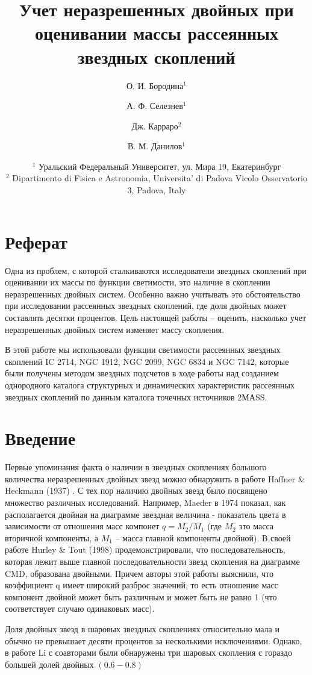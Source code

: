 \documentclass[a4paper,12pt]{article}
\title{Учет неразрешенных двойных при оценивании массы рассеянных звездных скоплений}
\author{О. И. Бородина$^1$ \and А. Ф. Селезнев$^1$ \and Дж. Карраро$^2$ \and В. М. Данилов$^1$ }
\date{\footnotesize{
    $^1$ Уральский Федеральный Университет, ул. Мира 19, Екатеринбург\\%
    $^2$ Dipartimento di Fisica e Astronomia, Universita’ di Padova Vicolo Osservatorio 3, Padova, Italy}\\%
    }
\begin{document}
\maketitle
\section*{Реферат}
Одна из проблем, с которой сталкиваются исследователи звездных скоплений при оценивании их массы по функции светимости, это наличие в скоплении неразрешенных двойных систем. Особенно важно учитывать это обстоятельство при исследовании рассеянных звездных скоплений, где доля двойных может составлять десятки процентов. Цель настоящей работы -- оценить, насколько учет неразрешенных двойных систем изменяет массу скопления.
 
В этой работе мы использовали функции светимости рассеянных звездных скоплений IC 2714, NGC 1912, NGC 2099, NGC 6834 и NGC 7142, которые были получены методом звездных подсчетов в ходе работы над созданием однородного каталога структурных и динамических характеристик рассеянных звездных скоплений по данным каталога точечных источников 2МАSS.

\section*{Введение}
Первые упоминания факта о наличии в звездных скоплениях большого количества неразрешенных двойных звезд можно обнаружить в работе Haffner \& Heckmann (1937) \cite{HH}.
С тех пор наличию двойных звезд было посвящено множество различных исследований. Например, Maeder в 1974 \cite{Maeder} показал, как располагается двойная на диаграмме звездная величина - показатель цвета в зависимости от отношения масс компонет $q=M_2/M_1$ (где $M_2$ это масса вторичной компоненты, а $M_1$ -- масса главной компоненты двойной). В своей работе Hurley \& Tout (1998) \cite{HT} продемонстрировали, что последовательность, которая лежит выше главной последовательности звезд скопления на диаграмме CMD, образована двойными. Причем авторы этой работы выяснили, что коэффициент q имеет широкий разброс значений, то есть отношение масс компонент двойной может быть различным и может быть не равно 1 (что соответствует случаю одинаковых масс). 

Доля двойных звезд в шаровых звездных скоплениях относительно мала и обычно не превышает десяти процентов \cite{Milone2012} за несколькими исключениями. Однако, в работе Li с соавторами \cite{Li17} были обнаружены три шаровых скопления с гораздо большей долей двойных $(0.6-0.8)$
\end{document}
